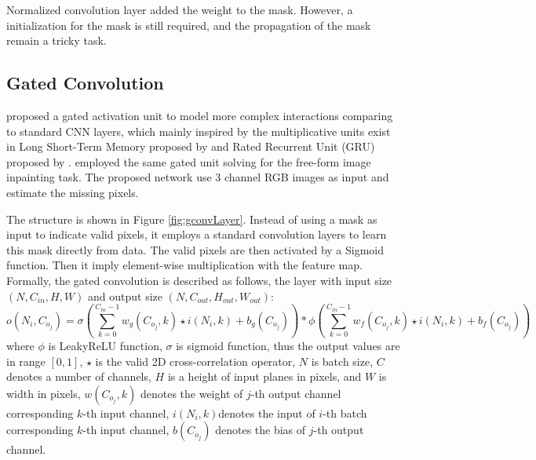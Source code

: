 \documentclass[border=15pt, multi, tikz]{article}
\begin{document}
Normalized convolution layer added the weight to the mask. However, a initialization for the mask is still required, and the propagation of the mask remain a tricky task. 

\subsection{Gated Convolution}

\cite{gated_activation} proposed a gated activation unit to model more complex interactions comparing to standard CNN layers, which mainly inspired by the multiplicative units exist in Long Short-Term Memory proposed by \cite{lstm} and Rated Recurrent Unit (GRU) proposed by \cite{gru}. 
\cite{gconv} employed the same gated unit solving for the free-form image inpainting task. The proposed network use 3 channel RGB images as input and estimate the missing pixels. 


The structure is shown in Figure \ref{fig:gconvLayer}. Instead of using a mask as input to indicate valid pixels, it employs a standard convolution layers to learn this mask directly from data. The valid pixels are then activated by a Sigmoid function. Then it imply element-wise multiplication with the feature map. Formally, the gated convolution is described as follows, the layer with input size $ (N, C_{in}, H, W) $ and output size $ (N, C_{out}, H_{out}, W_{out}) $:
\begin{equation}\label{gconv}
	o(N_i, C_{o_j}) = \sigma(\sum_{k=0}^{C_{in}-1}w_g(C_{o_j}, k) \star i(N_i,k) + b_g(C_{o_j})) * 
	\phi (\sum_{k=0}^{C_{in}-1}w_f(C_{o_j}, k) \star i(N_i,k) + b_f(C_{o_j}))
\end{equation}
where $ \phi $ is LeakyReLU function, $ \sigma $ is sigmoid function, thus the output values are in range $ [0,1] $, $ \star $ is the valid 2D cross-correlation operator, $ N $ is batch size, $ C $ denotes a number of channels, $ H $ is a height of input planes in pixels, and $ W $ is width in pixels, $ w(C_{o_j},k) $ denotes the weight of $ j $-th output channel corresponding $ k $-th input channel, $ i(N_i, k) $denotes the input of $ i $-th batch corresponding $ k $-th input channel, $ b(C_{o_j}) $ denotes the bias of $ j $-th output channel.
\end{document}
